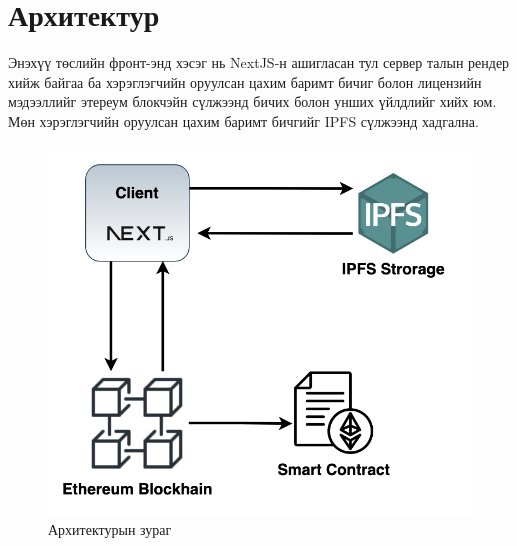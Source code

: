 \newpage
\section{Архитектур}
Энэхүү төслийн фронт-энд хэсэг нь NextJS-н ашигласан тул сервер талын рендер хийж байгаа ба хэрэглэгчийн оруулсан цахим баримт бичиг болон лицензийн мэдээллийг этереум блокчэйн сүлжээнд бичих болон унших үйлдлийг хийх юм. Мөн хэрэглэгчийн оруулсан цахим баримт бичгийг IPFS сүлжээнд хадгална.

\begin{figure}[h!]
	\centering
	\includegraphics[scale=0.4]{src/images/architecture.png}
	\caption{Архитектурын зураг}
\end{figure}

